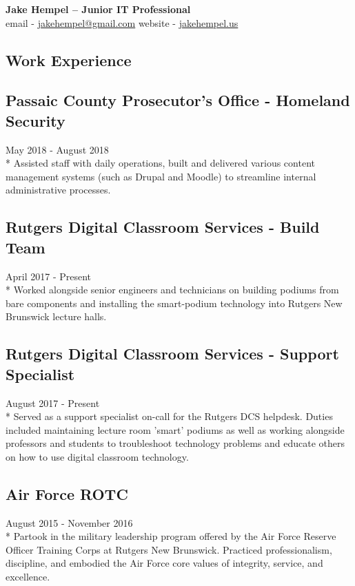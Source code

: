 \documentclass{article}
\begin{document}
\begin{center}
\huge{\textbf{Jake Hempel -- Junior IT Professional}} \\
\large{email - \href{mailto:jakehempel@gmail.com}{jakehempel@gmail.com}
website - \href{jakehempel.us}{jakehempel.us}}
\end{center}

\begin{multicols}{2}

\section{Work Experience}

\subsection{Passaic County Prosecutor's Office - Homeland Security}
May 2018 - August 2018\\*
Assisted staff with daily operations, built and delivered various content management systems (such as  Drupal and Moodle) to streamline internal administrative processes. 

\subsection{Rutgers Digital Classroom Services - Build Team}
April 2017 - Present\\*
Worked alongside senior engineers and technicians on building podiums from bare components and installing the smart-podium technology into Rutgers New Brunswick lecture halls.

\subsection{Rutgers Digital Classroom Services - Support Specialist}
August 2017 - Present\\*
Served as a support specialist on-call for the Rutgers DCS helpdesk. Duties included maintaining lecture room 'smart' podiums as well as working alongside professors and students to troubleshoot technology problems and educate others on how to use digital classroom technology.

\subsection{Air Force ROTC}
August 2015 - November 2016\\*
Partook in the military leadership program offered by the Air Force Reserve Officer Training Corps at Rutgers New Brunswick. Practiced professionalism, discipline, and embodied the Air Force core values of integrity, service, and excellence.


\end{multicols}
\end{document}
